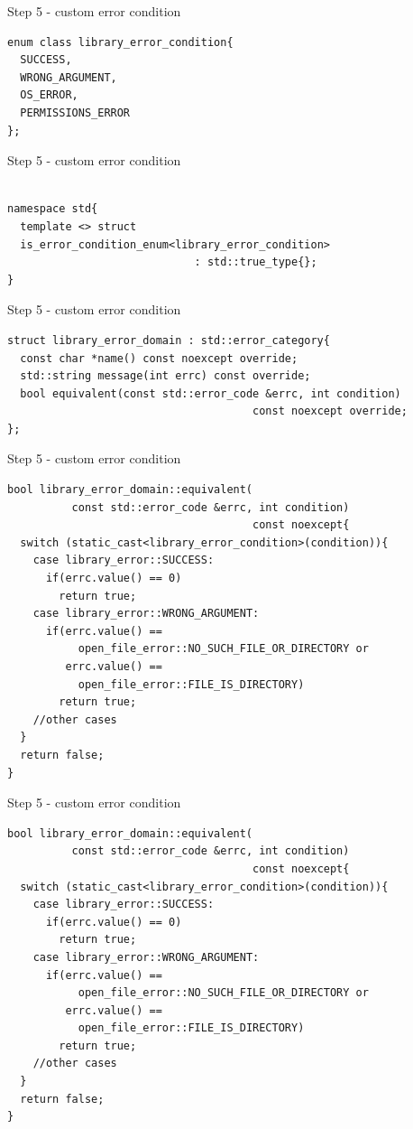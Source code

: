 \documentclass[10pt]{beamer}
\begin{document}
\begin{frame}[fragile]{Step 5 - custom error condition}
	\begin{verbatim}
enum class library_error_condition{
  SUCCESS,
  WRONG_ARGUMENT,
  OS_ERROR,
  PERMISSIONS_ERROR
};
	\end{verbatim}
\end{frame}

\begin{frame}[fragile]{Step 5 - custom error condition}
	\begin{verbatim}

namespace std{
  template <> struct
  is_error_condition_enum<library_error_condition>
                             : std::true_type{};
}
	\end{verbatim}
\end{frame}

\begin{frame}[fragile]{Step 5 - custom error condition}
	\begin{verbatim}
struct library_error_domain : std::error_category{
  const char *name() const noexcept override;
  std::string message(int errc) const override;
  bool equivalent(const std::error_code &errc, int condition) 
                                      const noexcept override;
};
	\end{verbatim}
\end{frame}

\begin{frame}[fragile]{Step 5 - custom error condition}
	\begin{verbatim}
bool library_error_domain::equivalent(
          const std::error_code &errc, int condition) 
                                      const noexcept{                     
  switch (static_cast<library_error_condition>(condition)){
    case library_error::SUCCESS:
      if(errc.value() == 0)
        return true;
    case library_error::WRONG_ARGUMENT:
      if(errc.value() == 
           open_file_error::NO_SUCH_FILE_OR_DIRECTORY or
         errc.value() == 
           open_file_error::FILE_IS_DIRECTORY)
        return true;
    //other cases    
  }
  return false;
}
	\end{verbatim}
\end{frame}

\begin{frame}[fragile]{Step 5 - custom error condition}
	\begin{verbatim}
bool library_error_domain::equivalent(
          const std::error_code &errc, int condition) 
                                      const noexcept{                     
  switch (static_cast<library_error_condition>(condition)){
    case library_error::SUCCESS:
      if(errc.value() == 0)
        return true;
    case library_error::WRONG_ARGUMENT:
      if(errc.value() == 
           open_file_error::NO_SUCH_FILE_OR_DIRECTORY or
         errc.value() == 
           open_file_error::FILE_IS_DIRECTORY)
        return true;
    //other cases    
  }
  return false;
}
	\end{verbatim}
\end{frame}
\end{document}
